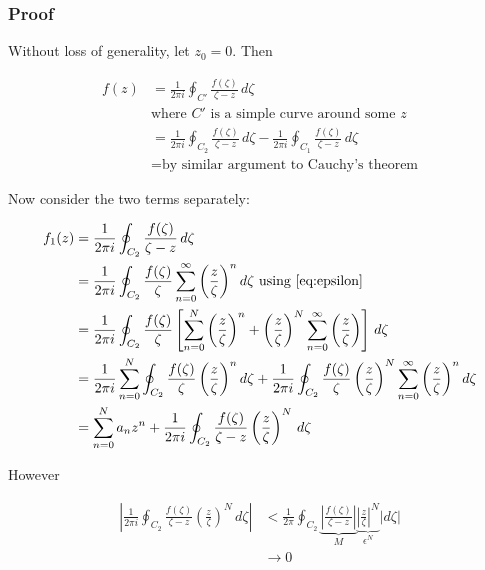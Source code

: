 \documentclass{physics_notes}
\begin{document}
\subsubsection*{Proof}

Without loss of generality, let $z_0 = 0$. Then

\begin{align*}
f(z) &= \frac{1}{2\pi i} \oint_{C'} \frac{f(\zeta)}{\zeta - z}\, d\zeta \\
&\text{where $C'$ is a simple curve around some $z$} \\
&= \frac{1}{2\pi i} \oint_{C_2} \frac{f(\zeta)}{\zeta - z}\, d\zeta - \frac{1}{2\pi i} \oint_{C_1} \frac{f(\zeta)}{\zeta - z}\, d\zeta \\
&=\text{by similar argument to Cauchy's theorem}
\end{align*}

Now consider the two terms separately:

\begin{align*}
f_1 (z) &= \frac{1}{2\pi i} \oint_{C_2} \frac{f(\zeta)}{\zeta - z}\, d\zeta \\
&= \frac{1}{2\pi i} \oint_{C_2} \frac{f(\zeta)}{\zeta} \sum_{n=0}^\infty \left(\frac{z}{\zeta}\right)^n d\zeta \text{ using \ref{eq:epsilon}}\\
&= \frac{1}{2\pi i} \oint_{C_2} \frac{f(\zeta)}{\zeta} \left[ \sum_{n=0}^N \left(\frac{z}{\zeta}\right)^n + \left(\frac{z}{\zeta}\right)^N \sum_{n=0}^\infty \left(\frac{z}{\zeta}\right) \right] \, d\zeta \\
&= \frac{1}{2\pi i }\sum_{n=0}^N \oint_{C_2} \frac{f(\zeta)}{\zeta} \left(\frac{z}{\zeta}\right)^n d\zeta + \frac{1}{2\pi i}\oint_{C_2} \frac{f(\zeta)}{\zeta} \left(\frac{z}{\zeta}\right)^N \sum_{n=0}^\infty \left(\frac{z}{\zeta}\right)^n d\zeta \\
&= \sum_{n=0}^N a_n z^n + \frac{1}{2\pi i} \oint_{C_2} \frac{f(\zeta)}{\zeta - z} \left(\frac{z}{\zeta}\right)^N \, d\zeta
\end{align*}

However

\begin{align*} 
\left|\frac{1}{2\pi i} \oint_{C_2} \frac{f(\zeta)}{\zeta - z} \left(\frac{z}{\zeta}\right)^N \, d\zeta \right| &< \frac{1}{2\pi} \oint_{C_2} \underbrace{\left|\frac{f(\zeta)}{\zeta - z}\right|}_{M} \underbrace{\left|\frac{z}{\zeta}\right|^N}_{\epsilon^N} \left|d\zeta\right| \\
&\to 0
\end{align*}
\end{document}
